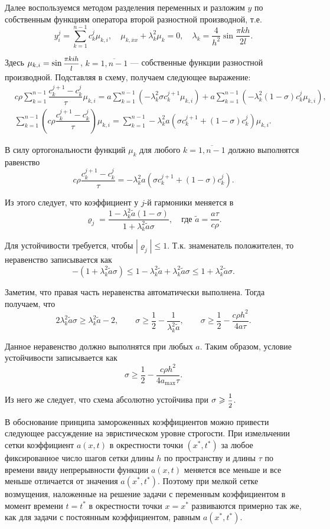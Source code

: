 \documentclass[12pt, a4paper]{article}
\begin{document}
\begin{enumerate}
		Далее воспользуемся методом разделения переменных и разложим $y$ по собственным функциям оператора второй разностной производной, т.е.
		\[
		y_i^j = \sum_{k=1}^{n-1} c_k^j \mu_{k, i}, \quad \mu_{k, \overline{x} x} + \lambda_k^2 \mu_k = 0, \quad \lambda_k = \frac4{h^2} \sin \frac{\pi k h}{2l}.
		\]
		
		Здесь $\mu_{k, i} = \sin \hbox{\footnotesize$\displaystyle\frac{\pi k i h}{l}$}$, $k = \overline{1, n-1}$ --- собственные функции разностной производной. Подставляя в схему, получаем следующее выражение:
		\begin{eqnarray*}
			& c\rho \sum\limits_{k=1}^{n-1}\dfrac{c_k^{j+1}-c_k^j}\tau \mu_{k, i} = a \sum\limits_{k=1}^{n-1} (-\lambda_k^2 \sigma c_k^{j+1} \mu_{k, i} ) + a \sum\limits_{k=1}^{n-1} (-\lambda_k^2 (1-\sigma) c_k^j \mu_{k, i} ), \\
			& \sum\limits_{k=1}^{n-1} \left(c\rho \dfrac{c_k^{j+1}-c_k^j}\tau\right) \mu_{k, i} = \sum\limits_{k=1}^{n-1} -\lambda_k^2 a(\sigma c_k^{j+1} + (1-\sigma) c_k^j) \mu_{k, i}.
		\end{eqnarray*}
		
		В силу ортогональности функций $\mu_k$ для любого $k = \overline{1, n-1}$ должно выполнятся равенство
		\[
		c\rho \dfrac{c_k^{j+1}-c_k^j}\tau = -\lambda_k^2 a(\sigma c_k^{j+1} + (1-\sigma) c_k^j).
		\]
		
		Из этого следует, что коэффициент у $j$-й гармоники меняется в
		\[
		\varrho_j = \frac{1 - \lambda_k^2 \tilde{a}(1-\sigma)}{1+\lambda_k^2 \tilde{a} \sigma}, \quad \textrm{где } \tilde{a} = \frac{a \tau}{c\rho}.
		\]
		
		Для устойчивости требуется, чтобы $|\varrho_j| \le 1$. Т.к. знаменатель положителен, то неравенство записывается как
		\[
		- (1+\lambda_k^2 \tilde{a} \sigma) \le 1 - \lambda_k^2 \tilde{a} + \lambda_k^2 \tilde{a} \sigma \le 1+\lambda_k^2 \tilde{a} \sigma.
		\]
		
		Заметим, что правая часть неравенства автоматически выполнена. Тогда получаем, что
		\[
		2 \lambda_k^2 \tilde{a} \sigma \ge \lambda_k^2 \tilde{a} - 2, \qquad \sigma \ge \frac12 - \frac1{\lambda_k^2 \tilde{a}}, \qquad \sigma \ge \frac12 - \frac{c\rho h^2}{4 a \tau}.
		\]
		
		Данное неравенство должно выполнятся при любых $a$. Таким образом, условие устойчивости записывается как
		\[
		\sigma \ge \frac12 - \frac{c\rho h^2}{4 a_{\max} \tau}.
		\]
		
		Из него же следует, что схема абсолютно устойчива при $\sigma \geqslant \hbox{\footnotesize$\displaystyle\frac{1}{2}$}$.
		
		В обоснование принципа замороженных коэффициентов можно привести следующее рассуждение на эвристическом уровне строгости. При измельчении сетки коэффициент $a(x, t)$ в окрестности точки $(x^*, t^*)$ за любое фиксированное число шагов сетки длины $h$ по пространству и длины $\tau$ по времени ввиду непрерывности функции $a(x, t)$ меняется все меньше и все меньше отличается от значения $a(x^*, t^*)$. Поэтому при мелкой сетке возмущения, наложенные на решение задачи с переменным коэффициентом в момент времени $t = t^*$ в окрестности точки $x = x^*$ развиваются примерно так же, как для задачи с постоянным коэффициентом, равным $a(x^*, t^*)$\cite{godunov}.
		

\end{enumerate}
\end{document}
